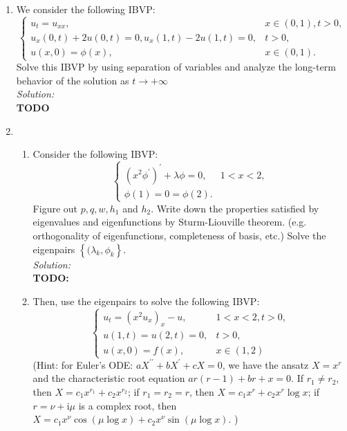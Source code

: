 \documentclass[10pt]{amsart}
\newcommand{\I}{\mathrm{i}}
\theoremstyle{nonumberplain}
\begin{document}
\begin{enumerate}[label={\bf {\arabic*}:}]
\item We consider the following IBVP:
$$
\begin{cases}
u_t = u_{xx}, &x \in (0, 1), t> 0, \\
u_x(0, t) + 2u(0, t) = 0, u_x(1, t) - 2u(1, t) = 0, &t > 0, \\
u(x, 0) = \phi(x), &x \in (0, 1).
\end{cases}
$$
Solve this IBVP by using separation of variables and analyze the long-term behavior of the solution as $t \rightarrow +\infty$
\\

\noindent
\textit{Solution:} \\
\textbf{TODO}

\newpage

\item
\begin{enumerate}
\item Consider the following IBVP:
$$
\begin{cases}
(x^2\phi^\prime)^\prime + \lambda \phi = 0, & 1 < x < 2, \\
\phi(1) = 0 = \phi(2).
\end{cases}
$$
Figure out $p, q, w, h_1$ and $h_2$.
Write down the properties satisfied by eigenvalues and eigenfunctions by Sturm-Liouville theorem. (e.g. orthogonality of eigenfunctions, completeness of basis, etc.)
Solve the eigenpairs $\left\{ (\lambda_k, \phi_k \right\}$. \\

\noindent
\textit{Solution:} \\
\textbf{TODO: }

\newpage


\item Then, use the eigenpairs to solve the following IBVP:
$$
\begin{cases}
u_t = (x^2u_x)_x - u, &1 < x< 2, t> 0, \\
u(1, t) = u(2, t) = 0, &t > 0, \\
u(x, 0) = f(x), &x \in (1, 2)
\end{cases}
$$
(Hint: for Euler's ODE: $aX^{\prime\prime} + bX^\prime + cX = 0$, we have the ansatz $X = x^r$ and the characteristic root equation $ar(r- 1) + br + x = 0$.
If $r_1 \neq r_2$, then $X = c_1x^{r_1} + c_2x^{r_2}$;
if $r_1 = r_2 = r$, then $X = c_1x^r + c_2x^r \log x$;
if $r = \nu + \I \mu$ is a complex root, then $X = c_1x^\nu \cos (\mu \log x) + c_2 x^\nu \sin(\mu \log x)$. ) \\


\end{enumerate}
\end{enumerate}
\end{document}
